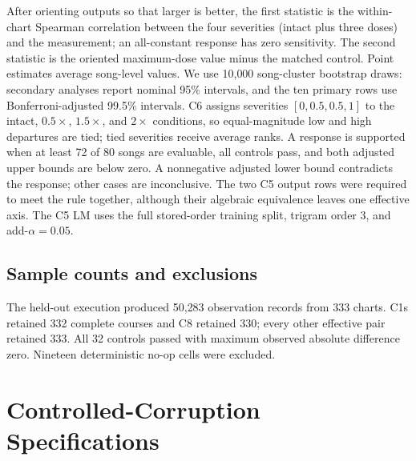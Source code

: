 \documentclass[10pt,twocolumn]{article}
\begin{document}
After orienting outputs so that larger is better, the first statistic is
the within-chart Spearman correlation between the four severities
(intact plus three doses) and the measurement; an all-constant response
has zero sensitivity. The second statistic is the oriented
maximum-dose value minus the matched control. Point estimates average
song-level values. We use 10{,}000 song-cluster bootstrap draws:
secondary analyses report nominal 95\% intervals, and the ten primary
rows use Bonferroni-adjusted 99.5\% intervals.
C6 assigns severities $[0,0.5,0.5,1]$ to the intact, $0.5\times$,
$1.5\times$, and $2\times$ conditions, so equal-magnitude low and high
departures are tied; tied severities receive average ranks.
A response is supported when at least 72 of 80 songs are evaluable, all
controls pass, and both adjusted upper bounds are below zero. A
nonnegative adjusted lower bound contradicts the response; other cases
are inconclusive. The two C5 output rows were required to meet the rule
together, although their algebraic equivalence leaves one effective
axis. The C5 LM uses the full stored-order training split, trigram order
3, and add-$\alpha=0.05$.

\subsection{Sample counts and exclusions}

The held-out execution produced 50{,}283 observation records from 333
charts. C1s retained 332 complete courses and C8 retained 330; every
other effective pair retained 333. All 32 controls passed with maximum
observed absolute difference zero. Nineteen deterministic no-op cells
were excluded.

\FloatBarrier

\section{Controlled-Corruption Specifications}\label{app:corruptions}
\end{document}
